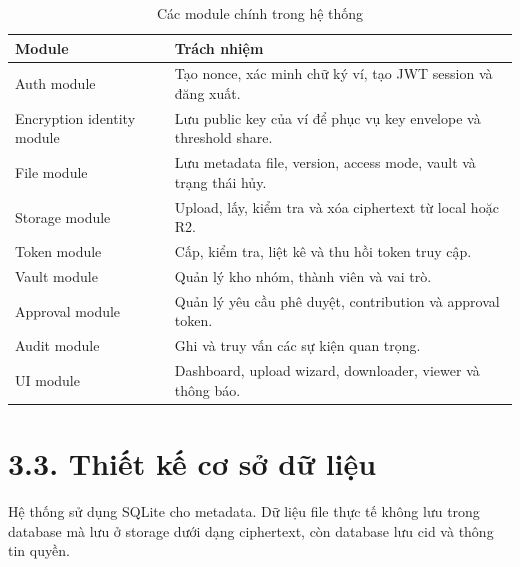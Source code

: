 \begin{table}[H]
\centering
\caption{Các module chính trong hệ thống}
\begin{tabularx}{\textwidth}{|p{3.5cm}|X|}
\hline
\textbf{Module} & \textbf{Trách nhiệm} \\ \hline
Auth module & Tạo nonce, xác minh chữ ký ví, tạo JWT session và đăng xuất. \\ \hline
Encryption identity module & Lưu public key của ví để phục vụ key envelope và threshold share. \\ \hline
File module & Lưu metadata file, version, access mode, vault và trạng thái hủy. \\ \hline
Storage module & Upload, lấy, kiểm tra và xóa ciphertext từ local hoặc R2. \\ \hline
Token module & Cấp, kiểm tra, liệt kê và thu hồi token truy cập. \\ \hline
Vault module & Quản lý kho nhóm, thành viên và vai trò. \\ \hline
Approval module & Quản lý yêu cầu phê duyệt, contribution và approval token. \\ \hline
Audit module & Ghi và truy vấn các sự kiện quan trọng. \\ \hline
UI module & Dashboard, upload wizard, downloader, viewer và thông báo. \\ \hline
\end{tabularx}
\end{table}

\section*{3.3. Thiết kế cơ sở dữ liệu}
{}

Hệ thống sử dụng SQLite cho metadata. Dữ liệu file thực tế không lưu trong database mà lưu ở storage dưới dạng ciphertext, còn database lưu cid và thông tin quyền.

